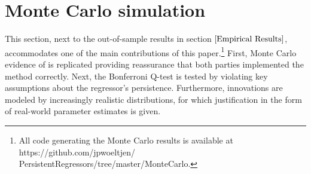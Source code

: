\documentclass[11pt, a4paper]{article}
\begin{document}
\section{Monte Carlo simulation}
This section, next to the out-of-sample results in section $\ref{Empirical Results}$, accommodates one of the main contributions of this paper.\footnote{All code generating the Monte Carlo results is available at https://github.com/jpwoeltjen/\\PersistentRegressors/tree/master/MonteCarlo.} First, Monte Carlo evidence of \citet{campbell2006efficient} is replicated providing reassurance that both parties implemented the method correctly. Next, the Bonferroni Q-test is tested by violating key assumptions about the regressor's persistence. Furthermore, innovations are modeled by increasingly realistic distributions, for which justification in the form of real-world parameter estimates is given.
\label{Monte Carlo simulation}
\end{document}
